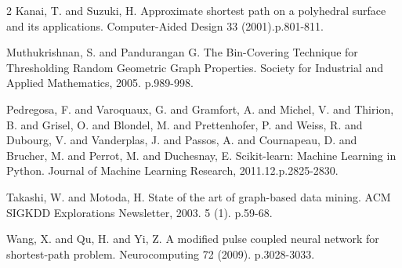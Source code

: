 \documentclass[10.5pt,journal]{IEEEtran}
\begin{document}
\begin{thebibliography} {2}
		 Kanai, T. and Suzuki, H.
		Approximate shortest path on a polyhedral surface and its applications.
		Computer-Aided Design 33 (2001).p.801-811.
		
		 Muthukrishnan, S. and Pandurangan G.
		The Bin-Covering Technique for Thresholding Random Geometric Graph Properties.
		Society for Industrial and Applied Mathematics, 2005.
		p.989-998.
		 
		 Pedregosa, F. and Varoquaux, G. and Gramfort, A. and Michel, V.
         and Thirion, B. and Grisel, O. and Blondel, M. and Prettenhofer, P.
         and Weiss, R. and Dubourg, V. and Vanderplas, J. and Passos, A. and
         Cournapeau, D. and Brucher, M. and Perrot, M. and Duchesnay, E.
         Scikit-learn: Machine Learning in Python.
         Journal of Machine Learning Research, 2011.12.p.2825-2830.
         
          Takashi, W. and Motoda, H.
         State of the art of graph-based data mining.
         ACM SIGKDD Explorations Newsletter, 2003. 5 (1). p.59-68.

         
          Wang, X. and Qu, H. and Yi, Z.
         A modified pulse coupled neural network for shortest-path problem.
         Neurocomputing 72 (2009).
         p.3028-3033.
         

	\end{thebibliography}
\end{document}
